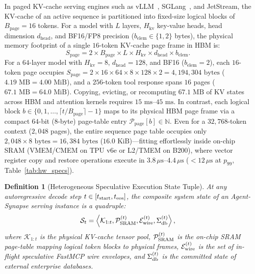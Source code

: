 \documentclass[10pt,conference]{IEEEtran}
\newtheorem{definition}{Definition}
\begin{document}
In paged KV-cache serving engines such as vLLM~\cite{kwon2023efficient}, SGLang~\cite{zheng2024sglang}, and JetStream, the KV-cache of an active sequence is partitioned into fixed-size logical blocks of $B_{\text{page}} = 16$ tokens. For a model with $L$ layers, $H_{\text{kv}}$ key-value heads, head dimension $d_{\text{head}}$, and BF16/FP8 precision ($b_{\text{elem}} \in \{1, 2\}$ bytes), the physical memory footprint of a single $16$-token KV-cache page frame in HBM is:
\begin{equation}
S_{\text{page}} = 2 \times B_{\text{page}} \times L \times H_{\text{kv}} \times d_{\text{head}} \times b_{\text{elem}}.
\label{eq:page_footprint}
\end{equation}
For a $64$-layer model with $H_{\text{kv}} = 8$, $d_{\text{head}} = 128$, and BF16 ($b_{\text{elem}} = 2$), each $16$-token page occupies $S_{\text{page}} = 2 \times 16 \times 64 \times 8 \times 128 \times 2 = 4{,}194{,}304\text{ bytes}$ ($4.19\text{ MB} = 4.00\text{ MiB}$), and a $256$-token tool response spans $16$ pages ($67.1\text{ MB} = 64.0\text{ MiB}$). Copying, evicting, or recomputing $67.1\text{ MB}$ of KV states across HBM and attention kernels requires $15\text{ ms}$--$45\text{ ms}$. In contrast, each logical block $b \in \{0, 1, \dots, \lceil t / B_{\text{page}} \rceil - 1\}$ maps to its physical HBM page frame via a compact $64$-bit ($8$-byte) page-table entry $\mathcal{P}_{\text{page}}[b] \in \mathbb{N}$. Even for a $32{,}768$-token context ($2{,}048$ pages), the entire sequence page table occupies only $2{,}048 \times 8\text{ bytes} = 16{,}384\text{ bytes}$ ($16.0\text{ KiB}$)---fitting effortlessly inside on-chip SRAM (VMEM/CMEM on TPU v6e or L2/TMEM on B200), where vector register copy and restore operations execute in $3.8\,\mu\text{s}$--$4.4\,\mu\text{s}$ ($< 12\,\mu\text{s}$ at $p_{99}$, Table~\ref{tab:hw_specs}).

\begin{definition}[Heterogeneous Speculative Execution State Tuple]
\label{def:sys_state}
At any autoregressive decode step $t \in [t_{\textnormal{start}}, t_{\textnormal{eos}}]$, the composite system state of an Agent-Synapse serving instance is a quadruple:
\begin{equation}
\mathcal{S}_t = \left\langle \mathcal{K}_{1:t}, \mathcal{P}_{\textnormal{SRAM}}^{(t)}, \mathcal{E}_{\textnormal{wire}}^{(t)}, \Sigma_{\textnormal{db}}^{(t)} \right\rangle,
\label{eq:sys_state}
\end{equation}
where $\mathcal{K}_{1:t}$ is the physical KV-cache tensor pool, $\mathcal{P}_{\textnormal{SRAM}}^{(t)}$ is the on-chip SRAM page-table mapping logical token blocks to physical frames, $\mathcal{E}_{\textnormal{wire}}^{(t)}$ is the set of in-flight speculative FastMCP wire envelopes, and $\Sigma_{\textnormal{db}}^{(t)}$ is the committed state of external enterprise databases.
\end{definition}
\end{document}
